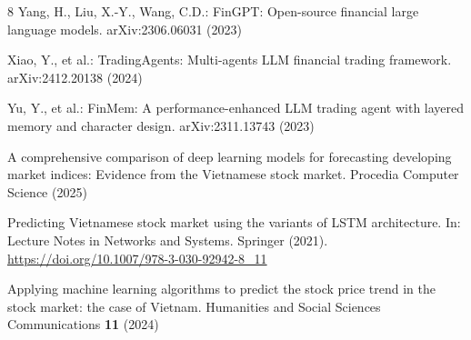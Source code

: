 \documentclass[runningheads]{llncs}
\begin{document}
\begin{thebibliography}{8}
Yang, H., Liu, X.-Y., Wang, C.D.: FinGPT: Open-source financial large language
models. arXiv:2306.06031 (2023)

Xiao, Y., et al.: TradingAgents: Multi-agents LLM financial trading framework.
arXiv:2412.20138 (2024)

Yu, Y., et al.: FinMem: A performance-enhanced LLM trading agent with layered
memory and character design. arXiv:2311.13743 (2023)

A comprehensive comparison of deep learning models for forecasting developing
market indices: Evidence from the Vietnamese stock market. Procedia Computer
Science (2025)

Predicting Vietnamese stock market using the variants of LSTM architecture. In:
Lecture Notes in Networks and Systems. Springer (2021).
\url{https://doi.org/10.1007/978-3-030-92942-8_11}

Applying machine learning algorithms to predict the stock price trend in the
stock market: the case of Vietnam. Humanities and Social Sciences
Communications \textbf{11} (2024)

\end{thebibliography}
\end{document}
